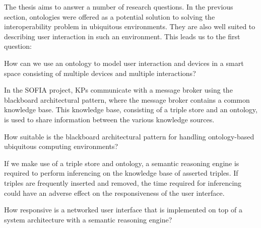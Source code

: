

The thesis aims to answer a number of research questions. In the previous section, ontologies were offered as a potential solution to solving the interoperability problem in ubiquitous environments. They are also well suited to describing user interaction in such an environment. This leads us to the first question:

\begin{question}
How can we use an ontology to model user interaction and devices in a smart space consisting of multiple devices and multiple interactions? 
\end{question}


\label{blackboard}
In the \ac{SOFIA} project, \acp{KP} communicate with a message broker using the blackboard architectural pattern, where the message broker contains a common knowledge base. This knowledge base, consisting of a triple store and an ontology, is used to share information between the various knowledge sources.

\begin{question}
How suitable is the blackboard architectural pattern for handling ontology-based ubiquitous computing environments? 
\end{question}


If we make use of a triple store and ontology, a semantic reasoning engine is required to perform inferencing on the knowledge base of asserted triples. If triples are frequently inserted and removed, the time required for inferencing could have an adverse effect on the responsiveness of the user interface.  

\begin{question}
How responsive is a networked user interface that is implemented on top of a system architecture with a semantic reasoning engine? 
\end{question}

